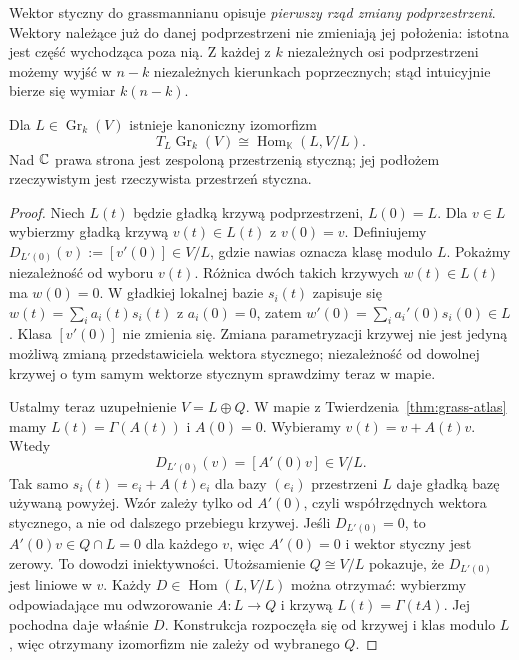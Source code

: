 Wektor styczny do grassmannianu opisuje \emph{pierwszy
rząd zmiany podprzestrzeni}. Wektory należące już do
danej podprzestrzeni nie zmieniają jej położenia:
istotna jest część wychodząca poza nią.
Z każdej z $k$ niezależnych osi podprzestrzeni możemy
wyjść w $n-k$ niezależnych kierunkach poprzecznych;
stąd intuicyjnie bierze się wymiar $k(n-k)$.

\begin{twierdzenie}
\label{thm:grass-styczna}
Dla $L\in\operatorname{Gr}_k(V)$ istnieje kanoniczny
izomorfizm
\begin{equation}\label{eq:grass-styczna}
 T_L\operatorname{Gr}_k(V)
  \cong\operatorname{Hom}_{\mathbb K}(L,V/L).
\end{equation}
Nad $\mathbb{C}$ prawa strona jest zespoloną przestrzenią
styczną; jej podłożem rzeczywistym jest rzeczywista
przestrzeń styczna.
\end{twierdzenie}
\begin{proof}
Niech $L(t)$ będzie gładką krzywą podprzestrzeni,
$L(0)=L$. Dla $v\in L$ wybierzmy gładką krzywą
$v(t)\in L(t)$ z $v(0)=v$. Definiujemy
$D_{L'(0)}(v):=[v'(0)]\in V/L$, gdzie nawias oznacza
klasę modulo $L$. Pokażmy niezależność od wyboru
$v(t)$. Różnica dwóch takich krzywych $w(t)\in L(t)$
ma $w(0)=0$. W gładkiej lokalnej bazie $s_i(t)$
zapisuje się $w(t)=\sum_i a_i(t)s_i(t)$ z
$a_i(0)=0$, zatem
$w'(0)=\sum_i a_i'(0)s_i(0)\in L$. Klasa
$[v'(0)]$ nie zmienia się. Zmiana parametryzacji
krzywej nie jest jedyną możliwą zmianą przedstawiciela wektora
stycznego; niezależność od dowolnej krzywej o tym samym wektorze
stycznym sprawdzimy teraz w mapie.

Ustalmy teraz uzupełnienie $V=L\oplus Q$.
W mapie z Twierdzenia~\ref{thm:grass-atlas} mamy
$L(t)=\Gamma(A(t))$ i $A(0)=0$.
Wybieramy $v(t)=v+A(t)v$. Wtedy
\[
 D_{L'(0)}(v)=[A'(0)v]\in V/L.
\]
Tak samo $s_i(t)=e_i+A(t)e_i$ dla bazy $(e_i)$ przestrzeni $L$
daje gładką bazę używaną powyżej. Wzór zależy tylko od $A'(0)$,
czyli współrzędnych wektora stycznego, a nie od dalszego przebiegu krzywej.
Jeśli $D_{L'(0)}=0$, to $A'(0)v\in Q\cap L=0$ dla każdego $v$,
więc $A'(0)=0$ i wektor styczny jest zerowy. To dowodzi iniektywności.
Utożsamienie $Q\cong V/L$ pokazuje, że
$D_{L'(0)}$ jest liniowe w $v$. Każdy
$D\in\operatorname{Hom}(L,V/L)$ można otrzymać:
wybierzmy odpowiadające mu odwzorowanie $A:L\to Q$
i krzywą $L(t)=\Gamma(tA)$. Jej pochodna daje
właśnie $D$. Konstrukcja rozpoczęła się od
krzywej i klas modulo $L$, więc otrzymany
izomorfizm nie zależy od wybranego $Q$.
\end{proof}

